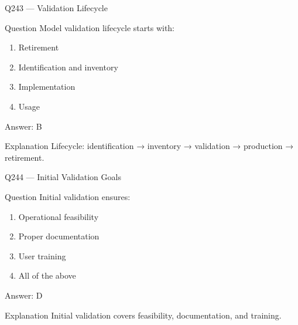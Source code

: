 \documentclass[aspectratio=169,8pt]{beamer}
\begin{document}
								\begin{frame}{Q243 --- Validation Lifecycle}
									\begin{block}{Question}
										Model validation lifecycle starts with:
										\begin{enumerate}
											\item Retirement
											\item Identification and inventory
											\item Implementation
											\item Usage
										\end{enumerate}
									\end{block}
									\begin{exampleblock}{Answer: B}\end{exampleblock}
									\begin{block}{Explanation}
										Lifecycle: identification → inventory → validation → production → retirement.
									\end{block}
								\end{frame}
								
								\begin{frame}{Q244 --- Initial Validation Goals}
									\begin{block}{Question}
										Initial validation ensures:
										\begin{enumerate}
											\item Operational feasibility
											\item Proper documentation
											\item User training
											\item All of the above
										\end{enumerate}
									\end{block}
									\begin{exampleblock}{Answer: D}\end{exampleblock}
									\begin{block}{Explanation}
										Initial validation covers feasibility, documentation, and training.
									\end{block}
								\end{frame}
								
\end{document}
